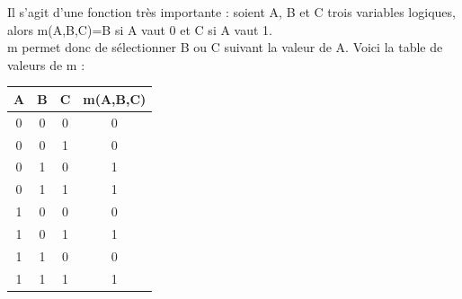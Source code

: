 Il s'agit d'une fonction très importante : soient A, B et C trois variables logiques, alors m(A,B,C)=B si A vaut 0 et C si A vaut 1.\\ m permet
donc de sélectionner B ou C suivant la valeur de A. Voici la table de valeurs de m :
\begin{center}
    \begin{tabular}{|c|c|c|c|}
        \hline\rowcolor{UGLiOrange}
        {\boxfont\color{white}A} & {\boxfont\color{white}B} & {\boxfont\color{white}C} & {\boxfont\color{white}m(A,B,C)} \\
        \hline
        0                        & 0                        & 0                        & 0                               \\
        \hline
        0                        & 0                        & 1                        & 0                               \\
        \hline
        0                        & 1                        & 0                        & 1                               \\
        \hline
        0                        & 1                        & 1                        & 1                               \\
        \hline
        1                        & 0                        & 0                        & 0                               \\
        \hline
        1                        & 0                        & 1                        & 1                               \\
        \hline
        1                        & 1                        & 0                        & 0                               \\
        \hline
        1                        & 1                        & 1                        & 1                               \\
        \hline
    \end{tabular}
\end{center}


